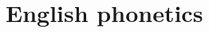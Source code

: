 \documentclass[12pt,a4paper]{book}
\begin{document}

%

%

%

\part{English phonetics}

\parttoc

%




\end{document}
